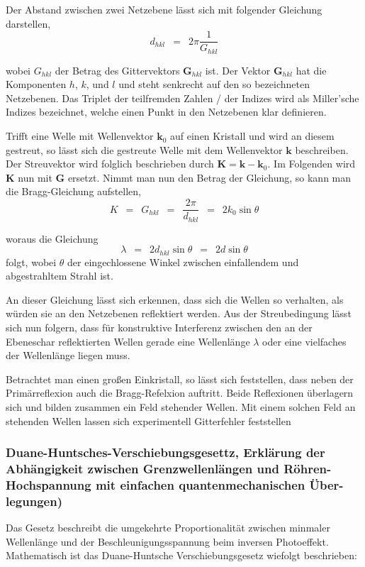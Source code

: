 \documentclass{article}
\newcommand{\widespace}{\enspace}
\newcommand{\wideeq}{\widespace = \widespace}
\begin{document}
Der Abstand zwischen zwei Netzebene lässt sich mit folgender Gleichung darstellen,
\[
    d_{hkl} \wideeq 2 \pi \frac{1}{G_{hkl}}
\]

wobei $G_{hkl}$ der Betrag des Gittervektors $\mathbf G_{hkl}$ ist.
Der Vektor $\mathbf G_{hkl}$ hat die Komponenten $h$, $k$, und $l$ und steht senkrecht auf den so bezeichneten Netzebenen.
Das Triplet der teilfremden Zahlen / der Indizes wird als Miller'sche Indizes bezeichnet, welche einen Punkt in den Netzebenen klar definieren.

Trifft eine Welle mit Wellenvektor $\mathbf k_0$ auf einen Kristall und wird an
diesem gestreut, so lässt sich die gestreute Welle mit dem Wellenvektor $\mathbf k$
beschreiben. Der Streuvektor wird folglich beschrieben durch
$\mathbf K = \mathbf k - \mathbf k_0$. Im Folgenden wird $\mathbf K$ nun mit
$\mathbf G$ ersetzt.
Nimmt man nun den Betrag der Gleichung, so kann man die Bragg-Gleichung aufstellen,
\[
    K \wideeq G_{hkl} \wideeq \frac{2\pi}{d_{hkl}} \wideeq 2 k_0 \sin \theta
\]

woraus die Gleichung
\[
    \lambda \wideeq 2 d_{hkl} \sin \theta \wideeq 2 d \sin \theta
\]
folgt, wobei $\theta$ der eingechlossene Winkel zwischen einfallendem und abgestrahltem Strahl ist.

An dieser Gleichung lässt sich erkennen, dass sich die Wellen so verhalten, als würden sie an den Netzebenen reflektiert werden. Aus der Streubedingung lässt sich nun folgern, dass für konstruktive Interferenz zwischen den an der Ebeneschar reflektierten Wellen gerade eine Wellenlänge $\lambda$ oder eine vielfaches der Wellenlänge liegen muss.

Betrachtet man einen großen Einkristall, so lässt sich feststellen, dass neben der Primärreflexion auch die Bragg-Refelxion auftritt. Beide Reflexionen überlagern sich und bilden zusammen ein Feld stehender Wellen. Mit einem solchen Feld an stehenden Wellen lassen sich experimentell Gitterfehler feststellen

\subsubsection{Duane-Huntsches-Verschiebungsgesettz, Erklärung der Abhängigkeit zwischen Grenzwellenlängen und Röhren-Hochspannung mit einfachen quantenmechanischen Über-legungen)}

\cite{spektrum}

Das Gesetz beschreibt die umgekehrte Proportionalität zwischen minmaler Wellenlänge und der Beschleunigungsspannung beim inversen Photoeffekt. Mathematisch ist das Duane-Huntsche Verschiebungsgesetz wiefolgt beschrieben:
\end{document}
